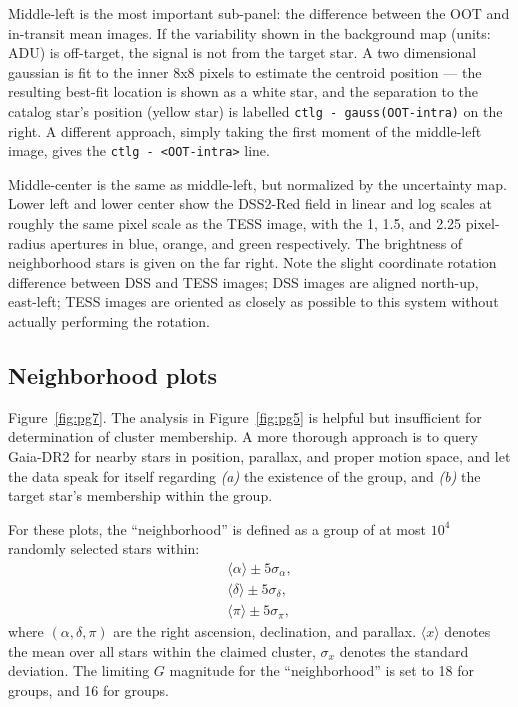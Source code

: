 \documentclass[12pt,twocolumn,tighten]{aastex62}
\begin{document}
Middle-left is the most important sub-panel: the difference between
the OOT and in-transit mean images.
If the variability shown in the background map (units: ADU) is off-target,
the signal is not from the target star.  
A two dimensional gaussian is fit to the inner 8x8 pixels to estimate
the centroid position --- the resulting best-fit location is shown as
a white star, and the separation to the catalog star's position
(yellow star) is labelled \texttt{ctlg - gauss(OOT-intra)} on the
right.
A different approach, simply taking the first moment of the middle-left
image, gives the \texttt{ctlg - <OOT-intra>} line.

Middle-center is the same as middle-left, but normalized by the
uncertainty map.  Lower left and lower center show the DSS2-Red field
in linear and log scales at roughly the same pixel scale as the TESS
image, with the 1, 1.5, and 2.25 pixel-radius apertures in blue,
orange, and green respectively.  The brightness of neighborhood stars
is given on the far right.  Note the slight coordinate rotation
difference between DSS and TESS images; DSS images are aligned
north-up, east-left; TESS images are oriented as closely as possible
to this system without actually performing the rotation.

\subsection{Neighborhood plots}
\label{sec:pg7}

Figure~\ref{fig:pg7}.
The analysis in Figure~\ref{fig:pg5} is helpful but insufficient for
determination of cluster membership.
A more thorough approach is to query Gaia-DR2 for
nearby stars in position, parallax, and proper motion space, and
let the data speak for itself regarding {\it (a)} the existence of
the group, and {\it (b)} the target star's membership within the group.

For these plots, the ``neighborhood'' is defined as a group of at
most $10^4$ randomly selected stars within:
\begin{align}
\langle \alpha \rangle \pm 5\sigma_\alpha, \\
\langle \delta \rangle \pm 5\sigma_\delta, \\
\langle \pi \rangle \pm 5\sigma_\pi,
\end{align}
where $(\alpha, \delta, \pi)$ are the right ascension,
declination, and parallax.
$\langle x \rangle$ denotes the mean over all stars within
the claimed cluster, $\sigma_x$ denotes the standard deviation.
The limiting $G$ magnitude for the ``neighborhood'' is set
to 18 for \citet{cantat-gaudin_gaia_2018} groups, and 16
for \cite{Kharchenko_et_al_2013} groups.
\end{document}
